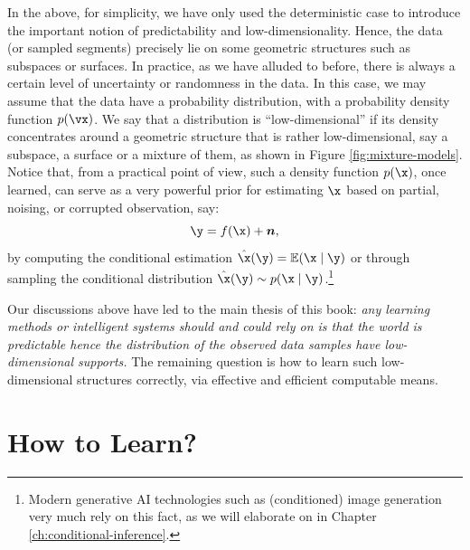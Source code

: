 \documentclass[../../book-main.tex]{subfiles}
\begin{document}
In the above, for simplicity, we have only used the deterministic case to introduce the important notion of predictability and low-dimensionality. Hence, the data (or sampled segments) precisely lie on some geometric structures such as subspaces or surfaces. In practice, as we have alluded to before, there is always a certain level of uncertainty or randomness in the data. In this case, we may assume that the data have a probability distribution, with a probability density function $p(\vx)$. We say that a distribution is ``low-dimensional'' if its density concentrates around a geometric structure that is rather low-dimensional, say a subspace, a surface or a mixture of them, as shown in Figure \ref{fig:mixture-models}. Notice that, from a practical point of view, such a density function $p(\x)$, once learned, can serve as a very powerful prior for estimating $\x$ based on partial, noising, or corrupted observation, say: 
\begin{equation}
\y = f(\x) + \boldsymbol{n},
\end{equation}
by computing the conditional estimation $\hat{\x}(\y) = \mathbb{E}(\x \mid \y)$ or through sampling the conditional distribution $\hat{\x}(\y) \sim p(\x\mid \y)$.\footnote{Modern generative AI technologies such as (conditioned) image generation very much rely on this fact, as we will elaborate on in Chapter \ref{ch:conditional-inference}.}

Our discussions above have led to the main thesis of this book: {\em any learning methods or intelligent systems should and could rely on is that the world is predictable hence the distribution of the observed data samples have low-dimensional supports.} The remaining question is how to learn such low-dimensional structures correctly, via effective and efficient computable means. 

\section{How to Learn?}
\end{document}
